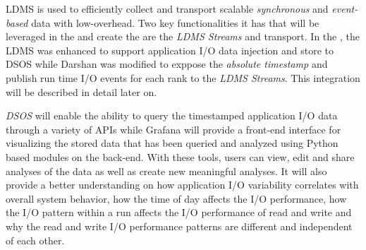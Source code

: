 \documentclass[conference]{IEEEtran}
\begin{document}
LDMS is used to efficiently collect and transport scalable \emph{synchronous} and \emph{event-based} data with low-overhead. Two key functionalities it has that will be leveraged in the \Darshan and create the \connector are the \emph{LDMS Streams} and transport. In the \Darshan, the LDMS was enhanced to support application I/O data injection and store to DSOS while Darshan was modified to exppose the \emph{absolute timestamp} and publish run time I/O events for each rank to the \emph{LDMS Streams}. This integration will be described in detail later on.   

\emph{DSOS} will enable the ability to query the timestamped application I/O data through a variety of APIs while Grafana will provide a front-end interface for visualizing the stored data that has been queried and analyzed using Python based modules on the back-end. With these tools, users can view, edit and share analyses of the data as well as create new meaningful analyses. It will also provide a better understanding on how application I/O variability correlates with overall system behavior, how the time of day affects the I/O performance, how the I/O pattern within a run affects the I/O performance of read and write and why the read and write I/O performance patterns are different and independent of each other.

\end{document}
